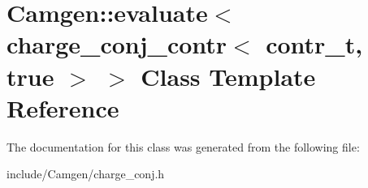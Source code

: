 \hypertarget{a00145}{}\section{Camgen\+:\+:evaluate$<$ charge\+\_\+conj\+\_\+contr$<$ contr\+\_\+t, true $>$ $>$ Class Template Reference}
\label{a00145}


The documentation for this class was generated from the following file\+:\begin{DoxyCompactItemize}
\item 
include/\+Camgen/charge\+\_\+conj.\+h\end{DoxyCompactItemize}
